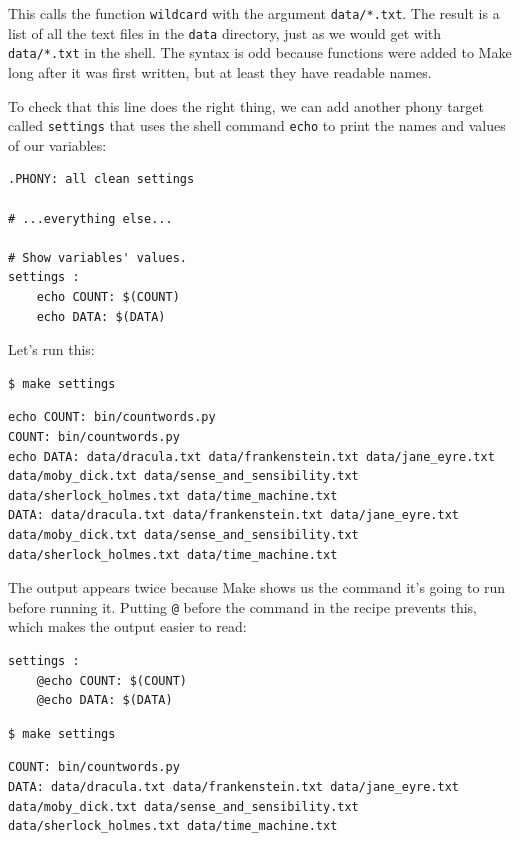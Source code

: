 \documentclass[
]{krantz}
\begin{document}
This calls the function \texttt{wildcard} with the argument \texttt{data/*.txt}.
The result is a list of all the text files in the \texttt{data} directory,
just as we would get with \texttt{data/*.txt} in the shell.
The syntax is odd because functions were added to Make long after it was first written,
but at least they have readable names.

To check that this line does the right thing,
we can add another phony target called \texttt{settings}
that uses the shell command \texttt{echo} to print the names and values of our variables:

\begin{verbatim}
.PHONY: all clean settings

# ...everything else...

# Show variables' values.
settings :
    echo COUNT: $(COUNT)
    echo DATA: $(DATA)
\end{verbatim}

Let's run this:

\begin{verbatim}
$ make settings
\end{verbatim}

\begin{verbatim}
echo COUNT: bin/countwords.py
COUNT: bin/countwords.py
echo DATA: data/dracula.txt data/frankenstein.txt data/jane_eyre.txt data/moby_dick.txt data/sense_and_sensibility.txt data/sherlock_holmes.txt data/time_machine.txt
DATA: data/dracula.txt data/frankenstein.txt data/jane_eyre.txt data/moby_dick.txt data/sense_and_sensibility.txt data/sherlock_holmes.txt data/time_machine.txt
\end{verbatim}

The output appears twice
because Make shows us the command it's going to run before running it.
Putting \texttt{@} before the command in the recipe prevents this,
which makes the output easier to read:

\begin{verbatim}
settings :
    @echo COUNT: $(COUNT)
    @echo DATA: $(DATA)
\end{verbatim}

\begin{verbatim}
$ make settings
\end{verbatim}

\begin{verbatim}
COUNT: bin/countwords.py
DATA: data/dracula.txt data/frankenstein.txt data/jane_eyre.txt data/moby_dick.txt data/sense_and_sensibility.txt data/sherlock_holmes.txt data/time_machine.txt
\end{verbatim}
\end{document}
